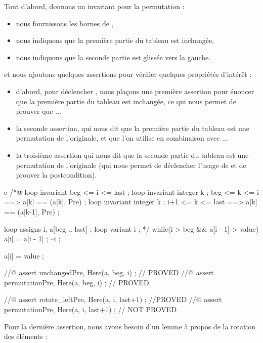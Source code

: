 Tout d'abord, donnons un invariant pour la permutation :

\begin{itemize}
    \item nous fournissons les bornes de ,
    \item nous indiquons que la première partie du tableau est inchangée,
    \item nous indiquons que la seconde partie est glissée vers la gauche.
\end{itemize}


et nous ajoutons quelques assertions pour vérifier quelques propriétés d'intérêt :
\begin{itemize}
    \item d'abord, pour déclencher , nous
          plaçons une première assertion pour énoncer que la première partie
          du tableau est inchangée, ce qui nous permet de prouver que ...
    \item la seconde assertion, qui nous dit que la première partie du tableau
          est une permutation de l'originale, et que l'on utilise en combinaison
          avec ...
    \item la troisième assertion qui nous dit que la seconde partie du tableau
          est une permutation de l'originale (qui nous permet de déclencher
          l'usage de  et de prouver la postcondition).
\end{itemize}


\begin{CodeBlock}{c}
  /*@
    loop invariant beg <= i <= last ;
    loop invariant \forall integer k ; beg <= k <= i    ==> a[k] == \at(a[k], Pre) ;
    loop invariant \forall integer k ; i+1 <= k <= last ==> a[k] == \at(a[k-1], Pre) ;

    loop assigns i, a[beg .. last] ;
    loop variant i ;
  */
  while(i > beg && a[i - 1] > value){
    a[i] = a[i - 1] ;
    --i ;
  }

  a[i] = value ;

  //@ assert unchanged{Pre, Here}(a, beg, i) ;   // PROVED
  //@ assert permutation{Pre, Here}(a, beg, i) ; // PROVED

  //@ assert rotate_left{Pre, Here}(a, i, last+1) ; //PROVED
  //@ assert permutation{Pre, Here}(a, i, last+1) ; // NOT PROVED
\end{CodeBlock}


Pour la dernière assertion, nous avons besoin d'un lemme à propos de la
rotation des éléments :


